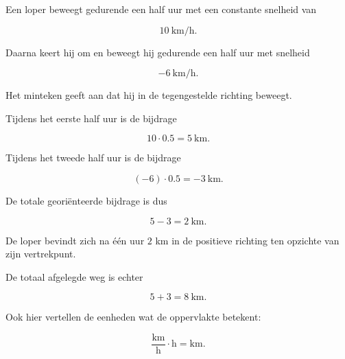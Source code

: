 \documentclass{ximera}
\begin{document}
\begin{voorbeeld}

Een loper beweegt gedurende een half uur met een constante snelheid van

\[
10\ \mathrm{km/h}.
\]

Daarna keert hij om en beweegt hij gedurende een half uur met snelheid

\[
-6\ \mathrm{km/h}.
\]

Het minteken geeft aan dat hij in de tegengestelde richting beweegt.

\begin{center}
\end{center}

Tijdens het eerste half uur is de bijdrage

\[
10\cdot0.5=5\ \mathrm{km}.
\]

Tijdens het tweede half uur is de bijdrage

\[
(-6)\cdot0.5=-3\ \mathrm{km}.
\]

De totale georiënteerde bijdrage is dus

\[
5-3=2\ \mathrm{km}.
\]

De loper bevindt zich na één uur \(2\) km in de positieve richting
ten opzichte van zijn vertrekpunt.

De totaal afgelegde weg is echter

\[
5+3=8\ \mathrm{km}.
\]

Ook hier vertellen de eenheden wat de oppervlakte betekent:

\[
\frac{\mathrm{km}}{\mathrm h}
\cdot
\mathrm h
=
\mathrm{km}.
\]


\end{voorbeeld}
\end{document}
